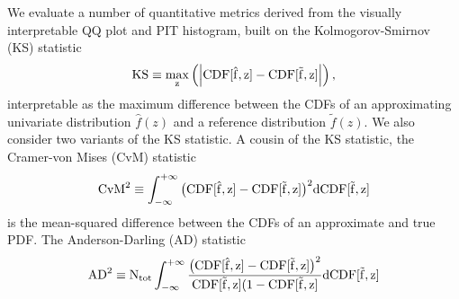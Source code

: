 
We evaluate a number of quantitative metrics derived from the visually interpretable QQ plot and PIT histogram, built on the Kolmogorov-Smirnov (KS) statistic
\begin{equation}
  \label{eq:ks}
  \rm{KS} \equiv \max_{z} \left( \left| \rm{CDF}[\hat{f}, z] - \rm{CDF}[\tilde{f}, z] \right| \right),
\end{equation}
interpretable as the maximum difference between the CDFs of an approximating univariate distribution $\hat{f}(z)$ and a reference distribution $\tilde{f}(z)$.
We also consider two variants of the KS statistic.
A cousin of the KS statistic, the Cramer-von Mises (CvM) statistic
\begin{equation}
\label{eq:cvm}
  \rm{CvM}^{2} \equiv \int_{-\infty}^{+\infty} \big(\rm{CDF}[\hat{f}, z] - \rm{CDF}[\tilde{f}, z]\big)^2 \mathrm{d}\rm{CDF}[\tilde{f}, z]
\end{equation}
is the mean-squared difference between the CDFs of an approximate and true PDF.
The Anderson-Darling (AD) statistic
\begin{equation} \label{eq:ad}
  \rm{AD}^2 \equiv N_{tot}\int_{-\infty}^{+\infty} \frac{\big(\rm{CDF}[\hat{f}, z] - \rm{CDF}[\tilde{f}, z]\big)^2} {\rm{CDF}[\tilde{f}, z] (1 -\rm{CDF}[\tilde{f}, z]} \mathrm{d}\rm{CDF}[\tilde{f}, z]
\end{equation}
